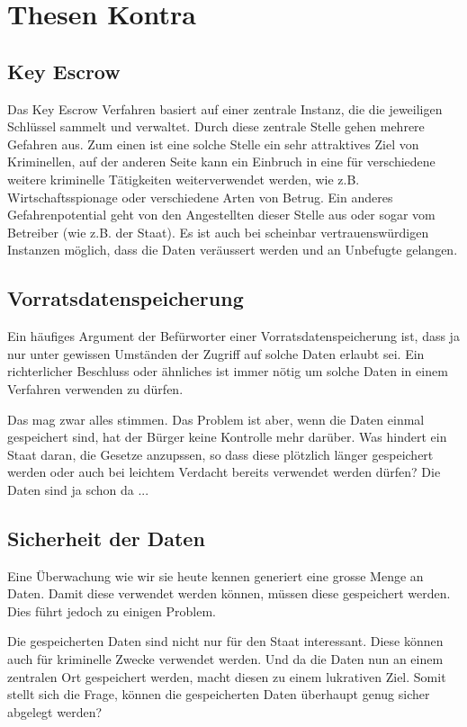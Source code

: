 \section*{Thesen Kontra}

\subsection*{Key Escrow}
Das Key Escrow Verfahren basiert auf einer zentrale Instanz,
die die jeweiligen Schlüssel sammelt und verwaltet.
Durch diese zentrale Stelle gehen mehrere Gefahren aus. Zum einen ist eine
solche Stelle ein sehr attraktives Ziel von Kriminellen, auf der
anderen Seite kann ein Einbruch in eine für verschiedene weitere
kriminelle Tätigkeiten weiterverwendet werden, wie z.B.
Wirtschaftsspionage oder verschiedene Arten von Betrug.
Ein anderes Gefahrenpotential geht von den Angestellten dieser Stelle aus oder
sogar vom Betreiber (wie z.B. der Staat).
Es ist auch bei scheinbar vertrauenswürdigen Instanzen möglich,
dass die Daten veräussert werden und an Unbefugte gelangen.

\subsection*{Vorratsdatenspeicherung}
Ein häufiges Argument der Befürworter einer Vorratsdatenspeicherung ist,
dass ja nur unter gewissen Umständen der Zugriff auf solche Daten erlaubt sei.
Ein richterlicher Beschluss oder ähnliches ist immer nötig um solche Daten
in einem Verfahren verwenden zu dürfen.

Das mag zwar alles stimmen. Das Problem ist aber, wenn die Daten einmal
gespeichert sind, hat der Bürger keine Kontrolle mehr darüber.
Was hindert ein Staat daran, die Gesetze anzupssen, so dass diese plötzlich
länger gespeichert werden oder auch bei leichtem Verdacht bereits verwendet
werden dürfen? Die Daten sind ja schon da ...

\subsection*{Sicherheit der Daten}
Eine Überwachung wie wir sie heute kennen generiert eine grosse Menge an Daten.
Damit diese verwendet werden können, müssen diese gespeichert werden.
Dies führt jedoch zu einigen Problem.

Die gespeicherten Daten sind nicht nur für den Staat interessant.
Diese können auch für kriminelle Zwecke verwendet werden.
Und da die Daten nun an einem zentralen Ort gespeichert werden, macht diesen
zu einem lukrativen Ziel. Somit stellt sich die Frage, können die gespeicherten
Daten überhaupt genug sicher abgelegt werden?

